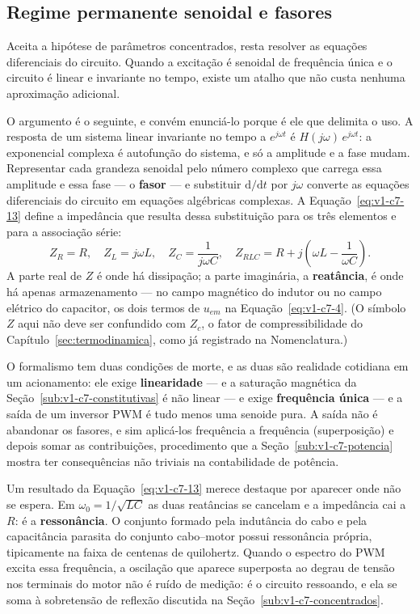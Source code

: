 \documentclass[12pt,a4paper]{article}
\numberwithin{equation}{section}
\numberwithin{table}{section}
\numberwithin{figure}{section}
\begin{document}
\subsection{Regime permanente senoidal e fasores}\label{sub:v1-c7-fasores}

Aceita a hipótese de parâmetros concentrados, resta resolver as equações
diferenciais do circuito. Quando a excitação é senoidal de frequência única e o
circuito é linear e invariante no tempo, existe um atalho que não custa
nenhuma aproximação adicional.

O argumento é o seguinte, e convém enunciá-lo porque é ele que delimita o uso.
A resposta de um sistema linear invariante no tempo a $e^{j\omega t}$ é
$H(j\omega)\,e^{j\omega t}$: a exponencial complexa é autofunção do sistema, e
só a amplitude e a fase mudam. Representar cada grandeza senoidal pelo número
complexo que carrega essa amplitude e essa fase --- o \textbf{fasor} --- e
substituir $\mathrm{d}/\mathrm{d}t$ por $j\omega$ converte as equações
diferenciais do circuito em equações algébricas complexas. A
Equação~\eqref{eq:v1-c7-13} define a impedância que resulta dessa substituição
para os três elementos e para a associação série:
\begin{equation}\label{eq:v1-c7-13}
Z_R = R,
\quad
Z_L = j\omega L,
\quad
Z_C = \frac{1}{j\omega C},
\quad
Z_{RLC} = R + j\left(\omega L - \frac{1}{\omega C}\right).
\end{equation}
A parte real de $Z$ é onde há dissipação; a parte imaginária, a
\textbf{reatância}, é onde há apenas armazenamento --- no campo magnético do
indutor ou no campo elétrico do capacitor, os dois termos de $u_{em}$ na
Equação~\eqref{eq:v1-c7-4}. (O símbolo $Z$ aqui não deve ser confundido com
$Z_c$, o fator de compressibilidade do Capítulo~\ref{sec:termodinamica}, como
já registrado na Nomenclatura.)

O formalismo tem duas condições de morte, e as duas são realidade cotidiana em
um acionamento: ele exige \textbf{linearidade} --- e a saturação magnética da
Seção~\ref{sub:v1-c7-constitutivas} é não linear --- e exige \textbf{frequência
única} --- e a saída de um inversor PWM é tudo menos uma senoide pura. A saída
não é abandonar os fasores, e sim aplicá-los frequência a frequência
(superposição) e depois somar as contribuições, procedimento que a
Seção~\ref{sub:v1-c7-potencia} mostra ter consequências não triviais na
contabilidade de potência.

Um resultado da Equação~\eqref{eq:v1-c7-13} merece destaque por aparecer onde
não se espera. Em $\omega_0 = 1/\sqrt{LC}$ as duas reatâncias se cancelam e a
impedância cai a $R$: é a \textbf{ressonância}. O conjunto formado pela
indutância do cabo e pela capacitância parasita do conjunto cabo--motor
possui ressonância própria, tipicamente na faixa de centenas de quilohertz.
Quando o espectro do PWM excita essa frequência, a oscilação que aparece
superposta ao degrau de tensão nos terminais do motor não é ruído de medição:
é o circuito ressoando, e ela se soma à sobretensão de reflexão discutida na
Seção~\ref{sub:v1-c7-concentrados}.
\end{document}
